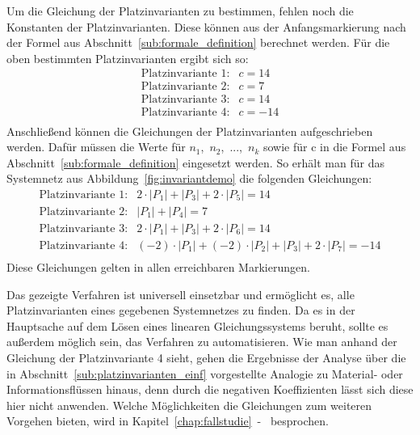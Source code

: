 		Um die Gleichung der Platzinvarianten zu bestimmen, fehlen noch die Konstanten der Platzinvarianten. Diese können aus der Anfangsmarkierung nach der Formel aus Abschnitt~\ref{sub:formale_definition} berechnet werden. Für die oben bestimmten Platzinvarianten ergibt sich so:
		$$
		\begin{matrix}
			\text{Platzinvariante 1}: & c = 14 	\\
			\text{Platzinvariante 2}: & c = 7 	\\
			\text{Platzinvariante 3}: & c = 14 	\\
			\text{Platzinvariante 4}: & c = -14 \\
		\end{matrix}
		$$
		Anschließend können die Gleichungen der Platzinvarianten aufgeschrieben werden. Dafür müssen die Werte für $n_1$,~$n_2$,~...,~$n_k$ sowie für c in die Formel aus Abschnitt~\ref{sub:formale_definition} eingesetzt werden. So erhält man für das Systemnetz aus Abbildung~\ref{fig:invariantdemo} die folgenden Gleichungen:
		$$
		\begin{matrix}
			\text{Platzinvariante 1}: & 2 \cdot |P_1| + |P_3| + 2 \cdot |P_5| = 14 \\
			\text{Platzinvariante 2}: & |P_1| + |P_4| = 7 \\
			\text{Platzinvariante 3}: & 2 \cdot |P_1| + |P_3| + 2 \cdot |P_6| = 14 \\
			\text{Platzinvariante 4}: & (-2) \cdot |P_1| + (-2) \cdot |P_2| + |P_3| + 2 \cdot |P_7|= -14 \\
		\end{matrix}
		$$
		Diese Gleichungen gelten in allen erreichbaren Markierungen.

		Das gezeigte Verfahren ist universell einsetzbar und ermöglicht es, alle Platzinvarianten eines gegebenen Systemnetzes zu finden. Da es in der Hauptsache auf dem Lösen eines linearen Gleichungssystems beruht, sollte es außerdem möglich sein, das Verfahren zu automatisieren. Wie man anhand der Gleichung der Platzinvariante 4 sieht, gehen die Ergebnisse der Analyse über die in Abschnitt~\ref{sub:platzinvarianten_einf} vorgestellte Analogie zu Material- oder Informationsflüssen hinaus, denn durch die negativen Koeffizienten lässt sich diese hier nicht anwenden. Welche Möglichkeiten die Gleichungen zum weiteren Vorgehen bieten, wird in Kapitel~\ref{chap:fallstudie}~-~ besprochen. 
